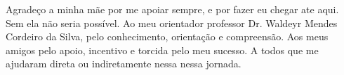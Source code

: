 \lipsum[1-4]

Agradeço a minha mãe por me apoiar sempre, e por fazer eu chegar ate aqui. Sem ela não seria possível.
Ao meu orientador professor Dr. Waldeyr Mendes Cordeiro da Silva, pelo conhecimento, orientação e compreensão.
Aos meus amigos pelo apoio, incentivo e torcida pelo meu sucesso.
A todos que me ajudaram direta ou indiretamente nessa nessa jornada. 
